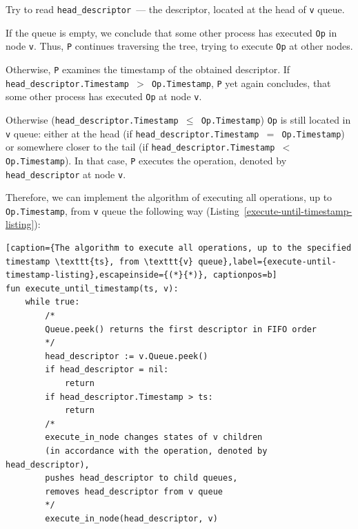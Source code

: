 \documentclass[times, dvipsnames,%
               languages={russian,english} %
              ]{itmo-student-thesis}
\begin{document}
\begin{nenum}
    \item Try to read \texttt{head\_descriptor}~--- the descriptor, located at the head of \texttt{v} queue.
    
    \item If the queue is empty, we conclude that some other process has executed \texttt{Op} in node \texttt{v}. Thus, \texttt{P} continues traversing the tree, trying to execute \texttt{Op} at other nodes.
    
    \item Otherwise, \texttt{P} examines the timestamp of the obtained descriptor. If \texttt{head\_descriptor.Timestamp $>$ Op.Timestamp}, \texttt{P} yet again concludes, that some other process has executed \texttt{Op} at node \texttt{v}.
    
    \item Otherwise (\texttt{head\_descriptor.Timestamp $\leq$ Op.Timestamp}) \texttt{Op} is still located in \texttt{v} queue: either at the head (if \texttt{head\_descriptor.Timestamp $=$ Op.Timestamp}) or somewhere closer to the tail (if \texttt{head\_descriptor.Timestamp $<$ Op.Timestamp}). In that case, \texttt{P} executes the operation, denoted by \texttt{head\_descriptor} at node \texttt{v}.
\end{nenum}

\bigbreak

Therefore, we can implement the algorithm of executing all operations, up to \texttt{Op.Timestamp}, from \texttt{v} queue the following way (Listing~\ref{execute-until-timestamp-listing}):

\renewcommand{\lstlistingname}{Listing}
\begin{lstlisting}[caption={The algorithm to execute all operations, up to the specified timestamp \texttt{ts}, from \texttt{v} queue},label={execute-until-timestamp-listing},escapeinside={(*}{*)}, captionpos=b]
fun execute_until_timestamp(ts, v):
    while true:
        /*
        Queue.peek() returns the first descriptor in FIFO order
        */
        head_descriptor := v.Queue.peek()
        if head_descriptor = nil:
            return
        if head_descriptor.Timestamp > ts:
            return
        /*
        execute_in_node changes states of v children
        (in accordance with the operation, denoted by head_descriptor), 
        pushes head_descriptor to child queues, 
        removes head_descriptor from v queue 
        */
        execute_in_node(head_descriptor, v)
\end{lstlisting}
\end{document}
